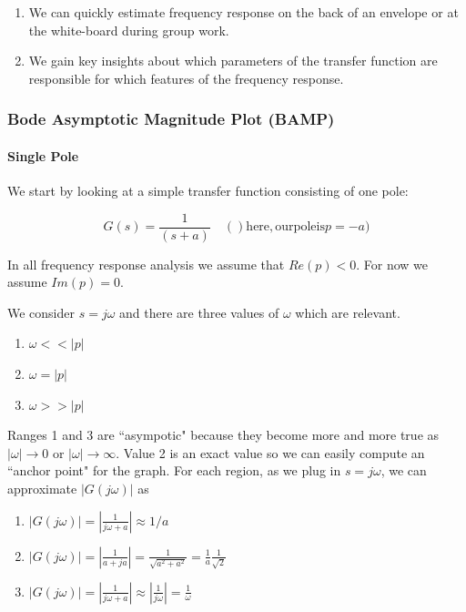 \begin{enumerate}
  \item  We can quickly estimate frequency response on the back of an envelope or at the white-board during group work.
  \item  We gain key insights about which parameters of the transfer function are responsible for which features of the frequency response.
\end{enumerate}


\subsubsection{Bode Asymptotic Magnitude Plot (BAMP)}


\paragraph{Single Pole}

We start by looking at a simple transfer function consisting of one pole:

\[
G(s) = \frac{1}{(s+a)}\quad ()\mathrm{here, our pole is }p=-a)
\]

In all frequency response analysis we assume that $Re(p) < 0$.  For now we assume $Im(p) = 0$.

We consider $s=j\omega$ and there are three values of $\omega$ which are relevant.

\begin{enumerate}
  \item  $\omega << |p|$
  \item  $\omega = |p|$
  \item  $\omega >> |p|$
\end{enumerate}

Ranges 1 and 3 are ``asympotic" because they become more and more true as $|\omega| \to 0$ or $|\omega| \to \infty$. Value 2 is an exact value  so we can easily compute an ``anchor point" for the graph.
For each region, as we plug in $s=j\omega$, we can approximate $|G(j\omega)|$ as

\begin{enumerate}
  \item  $|G(j\omega)| = \left | \frac{1}{j\omega+a} \right |  \approx 1/a$
  \item  $|G(j\omega)| = \left | \frac{1}{a+ja}    \right |       =    \frac {1} {\sqrt{a^2+a^2}} = \frac{1}{a}\frac{1}{\sqrt{2}}$
  \item  $|G(j\omega)| = \left | \frac{1}{j\omega+a} \right |  \approx \left | \frac{1}{j\omega} \right | = \frac{1}{\omega}$
\end{enumerate}

